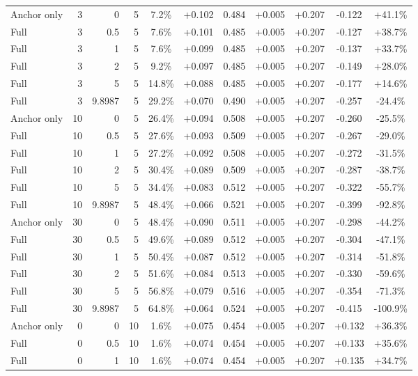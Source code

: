 \begin{table}[htbp]
\begin{tabular}{lrrrccccccc}
Anchor only & 3 & 0 & 5 & 7.2\% & +0.102 & 0.484 & +0.005 & +0.207 & -0.122 & +41.1\% \\
Full & 3 & 0.5 & 5 & 7.6\% & +0.101 & 0.485 & +0.005 & +0.207 & -0.127 & +38.7\% \\
Full & 3 & 1 & 5 & 7.6\% & +0.099 & 0.485 & +0.005 & +0.207 & -0.137 & +33.7\% \\
Full & 3 & 2 & 5 & 9.2\% & +0.097 & 0.485 & +0.005 & +0.207 & -0.149 & +28.0\% \\
Full & 3 & 5 & 5 & 14.8\% & +0.088 & 0.485 & +0.005 & +0.207 & -0.177 & +14.6\% \\
Full & 3 & 9.8987 & 5 & 29.2\% & +0.070 & 0.490 & +0.005 & +0.207 & -0.257 & -24.4\% \\
Anchor only & 10 & 0 & 5 & 26.4\% & +0.094 & 0.508 & +0.005 & +0.207 & -0.260 & -25.5\% \\
Full & 10 & 0.5 & 5 & 27.6\% & +0.093 & 0.509 & +0.005 & +0.207 & -0.267 & -29.0\% \\
Full & 10 & 1 & 5 & 27.2\% & +0.092 & 0.508 & +0.005 & +0.207 & -0.272 & -31.5\% \\
Full & 10 & 2 & 5 & 30.4\% & +0.089 & 0.509 & +0.005 & +0.207 & -0.287 & -38.7\% \\
Full & 10 & 5 & 5 & 34.4\% & +0.083 & 0.512 & +0.005 & +0.207 & -0.322 & -55.7\% \\
Full & 10 & 9.8987 & 5 & 48.4\% & +0.066 & 0.521 & +0.005 & +0.207 & -0.399 & -92.8\% \\
Anchor only & 30 & 0 & 5 & 48.4\% & +0.090 & 0.511 & +0.005 & +0.207 & -0.298 & -44.2\% \\
Full & 30 & 0.5 & 5 & 49.6\% & +0.089 & 0.512 & +0.005 & +0.207 & -0.304 & -47.1\% \\
Full & 30 & 1 & 5 & 50.4\% & +0.087 & 0.512 & +0.005 & +0.207 & -0.314 & -51.8\% \\
Full & 30 & 2 & 5 & 51.6\% & +0.084 & 0.513 & +0.005 & +0.207 & -0.330 & -59.6\% \\
Full & 30 & 5 & 5 & 56.8\% & +0.079 & 0.516 & +0.005 & +0.207 & -0.354 & -71.3\% \\
Full & 30 & 9.8987 & 5 & 64.8\% & +0.064 & 0.524 & +0.005 & +0.207 & -0.415 & -100.9\% \\
Anchor only & 0 & 0 & 10 & 1.6\% & +0.075 & 0.454 & +0.005 & +0.207 & +0.132 & +36.3\% \\
Full & 0 & 0.5 & 10 & 1.6\% & +0.074 & 0.454 & +0.005 & +0.207 & +0.133 & +35.6\% \\
Full & 0 & 1 & 10 & 1.6\% & +0.074 & 0.454 & +0.005 & +0.207 & +0.135 & +34.7\% \\

\end{tabular}
\end{table}
